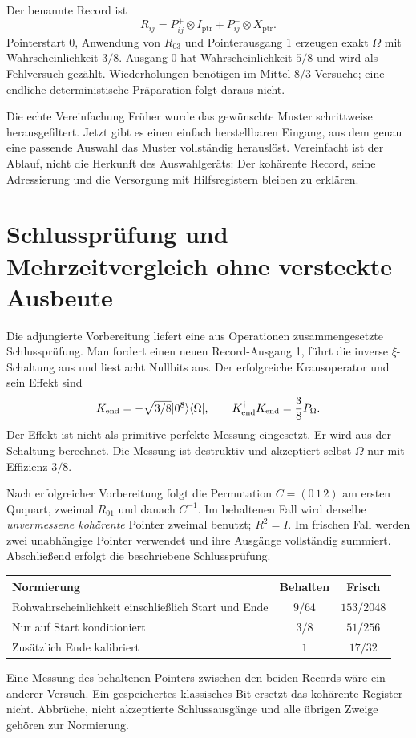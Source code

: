 Der benannte Record ist
\begin{equation}
R_{ij}=P^+_{ij}\otimes I_{\mathrm{ptr}}+P^-_{ij}\otimes X_{\mathrm{ptr}}.
\end{equation}
Pointerstart 0, Anwendung von $R_{03}$ und Pointerausgang 1 erzeugen exakt $\Omega$ mit Wahrscheinlichkeit $3/8$. Ausgang 0 hat Wahrscheinlichkeit $5/8$ und wird als Fehlversuch gezählt. Wiederholungen benötigen im Mittel $8/3$ Versuche; eine endliche deterministische Präparation folgt daraus nicht.

\begin{bild}{Die echte Vereinfachung}
Früher wurde das gewünschte Muster schrittweise herausgefiltert. Jetzt gibt es einen einfach herstellbaren Eingang, aus dem genau eine passende Auswahl das Muster vollständig herauslöst. Vereinfacht ist der Ablauf, nicht die Herkunft des Auswahlgeräts: Der kohärente Record, seine Adressierung und die Versorgung mit Hilfsregistern bleiben zu erklären.
\end{bild}

\section{Schlussprüfung und Mehrzeitvergleich ohne versteckte Ausbeute}
Die adjungierte Vorbereitung liefert eine aus Operationen zusammengesetzte Schlussprüfung. Man fordert einen neuen Record-Ausgang 1, führt die inverse $\xi$-Schaltung aus und liest acht Nullbits aus. Der erfolgreiche Krausoperator und sein Effekt sind
\begin{equation}
K_{\mathrm{end}}=-\sqrt{3/8}\lvert0^8\rangle\langle\Omega\rvert,
\qquad K_{\mathrm{end}}^\dagger K_{\mathrm{end}}=\frac38 P_\Omega.
\end{equation}
Der Effekt ist nicht als primitive perfekte Messung eingesetzt. Er wird aus der Schaltung berechnet. Die Messung ist destruktiv und akzeptiert selbst $\Omega$ nur mit Effizienz $3/8$.

Nach erfolgreicher Vorbereitung folgt die Permutation $C=(0\,1\,2)$ am ersten Ququart, zweimal $R_{01}$ und danach $C^{-1}$. Im behaltenen Fall wird derselbe \emph{unvermessene kohärente} Pointer zweimal benutzt; $R^2=I$. Im frischen Fall werden zwei unabhängige Pointer verwendet und ihre Ausgänge vollständig summiert. Abschließend erfolgt die beschriebene Schlussprüfung.
\begin{center}
\begin{tabular}{lcc}
\toprule
Normierung & Behalten & Frisch\\\midrule
Rohwahrscheinlichkeit einschließlich Start und Ende & $9/64$ & $153/2048$\\
Nur auf Start konditioniert & $3/8$ & $51/256$\\
Zusätzlich Ende kalibriert & $1$ & $17/32$\\\bottomrule
\end{tabular}
\end{center}
Eine Messung des behaltenen Pointers zwischen den beiden Records wäre ein anderer Versuch. Ein gespeichertes klassisches Bit ersetzt das kohärente Register nicht. Abbrüche, nicht akzeptierte Schlussausgänge und alle übrigen Zweige gehören zur Normierung.

